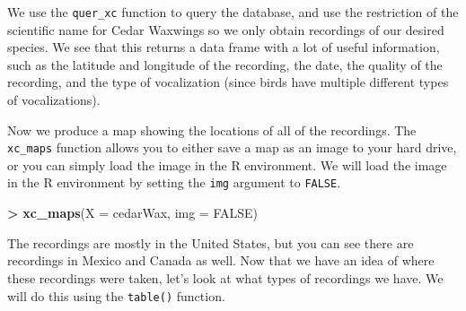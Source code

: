 \documentclass[]{krantz}
\makeatletter
\newenvironment{Shaded}{\begin{snugshade}}{\end{snugshade}}
\newcommand{\KeywordTok}[1]{\textcolor[rgb]{0.27,0.27,0.27}{\textbf{#1}}}
\newcommand{\DataTypeTok}[1]{\textcolor[rgb]{0.27,0.27,0.27}{#1}}
\newcommand{\StringTok}[1]{\textcolor[rgb]{0.5,0.5,0.5}{#1}}
\newcommand{\OtherTok}[1]{\textcolor[rgb]{0.37,0.37,0.37}{#1}}
\newcommand{\OperatorTok}[1]{\textcolor[rgb]{0.43,0.43,0.43}{\textbf{#1}}}
\newcommand{\NormalTok}[1]{#1}
\newenvironment{kframe}{%
\medskip{}
\setlength{\fboxsep}{.8em}
 \def\at@end@of@kframe{}%
 \ifinner\ifhmode%
  \def\at@end@of@kframe{\end{minipage}}%
  \begin{minipage}{\columnwidth}%
 \fi\fi%
 \def\FrameCommand##1{\hskip\@totalleftmargin \hskip-\fboxsep
 \colorbox{shadecolor}{##1}\hskip-\fboxsep
     \hskip-\linewidth \hskip-\@totalleftmargin \hskip\columnwidth}%
 \MakeFramed {\advance\hsize-\width
   \@totalleftmargin\z@ \linewidth\hsize
   \@setminipage}}%
 {\par\unskip\endMakeFramed%
 \at@end@of@kframe}
\renewenvironment{Shaded}{\begin{kframe}}{\end{kframe}}
\makeatother
\begin{document}
We use the \texttt{quer\_xc} function to query the database, and use the
restriction of the scientific name for Cedar Waxwings so we only obtain
recordings of our desired species. We see that this returns a data frame
with a lot of useful information, such as the latitude and longitude of
the recording, the date, the quality of the recording, and the type of
vocalization (since birds have multiple different types of
vocalizations).

Now we produce a map showing the locations of all of the recordings. The
\texttt{xc\_maps} function allows you to either save a map as an image
to your hard drive, or you can simply load the image in the R
environment. We will load the image in the R environment by setting the
\texttt{img} argument to \texttt{FALSE}.

\begin{Shaded}
\begin{Highlighting}[]
\OperatorTok{>}\StringTok{ }\KeywordTok{xc_maps}\NormalTok{(}\DataTypeTok{X =}\NormalTok{ cedarWax, }\DataTypeTok{img =} \OtherTok{FALSE}\NormalTok{)}
\end{Highlighting}
\end{Shaded}

The recordings are mostly in the United States, but you can see there
are recordings in Mexico and Canada as well. Now that we have an idea of
where these recordings were taken, let's look at what types of
recordings we have. We will do this using the \texttt{table()} function.

\begin{Shaded}
\end{Shaded}
\end{document}
